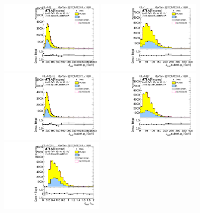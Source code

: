 \begin{figure}[htbp!]
\begin{center}
\includegraphics[angle=270, width=0.45\textwidth]{./figures/boosted/Sideband/b77_TwoTag_split_Sideband_leadHCand_trk0_Pt.pdf}
\includegraphics[angle=270, width=0.45\textwidth]{./figures/boosted/Sideband/b77_TwoTag_split_Sideband_leadHCand_trk1_Pt.pdf}\\
\includegraphics[angle=270, width=0.45\textwidth]{./figures/boosted/Sideband/b77_TwoTag_split_Sideband_sublHCand_trk0_Pt.pdf}
\includegraphics[angle=270, width=0.45\textwidth]{./figures/boosted/Sideband/b77_TwoTag_split_Sideband_sublHCand_trk1_Pt.pdf}\\
\includegraphics[angle=270, width=0.45\textwidth]{./figures/boosted/Sideband/b77_TwoTag_split_Sideband_leadHCand_trk_dr.pdf}

\end{center}
\end{figure}
